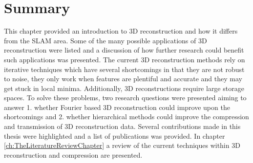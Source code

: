 \section{Summary}

This chapter provided an introduction to 3D reconstruction and how it differs from the SLAM area. Some of the many possible applications of 3D reconstruction were listed and a discussion of how further research could benefit such applications was presented. The current 3D reconstruction methods rely on iterative techniques which have several shortcomings in that they are not robust to noise, they only work when features are plentiful and accurate and they may get stuck in local minima. Additionally, 3D reconstructions require large storage spaces. To solve these problems, two research questions were presented aiming to answer 1. whether Fourier based 3D reconstruction could improve upon the shortcomings and 2. whether hierarchical methods could improve the compression and transmission of 3D reconstruction data. Several contributions made in this thesis were highlighted and a list of publications was provided. In chapter \ref{ch:TheLiteratureReviewChapter} a review of the current techniques within 3D reconstruction and compression are presented. \\



